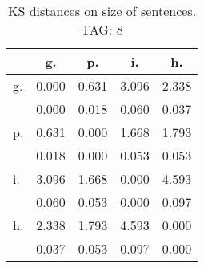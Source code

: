 \begin{table}[h!]
\begin{center}
\begin{tabular}{| l | c | c | c | c |}\hline
 & g. & p. & i. & h. \\\hline
g. & 0.000  & 0.631  & 3.096  & 2.338 \\\hline
 & 0.000  & 0.018  & 0.060  & 0.037 \\\hline
p. & 0.631  & 0.000  & 1.668  & 1.793 \\\hline
 & 0.018  & 0.000  & 0.053  & 0.053 \\\hline
i. & 3.096  & 1.668  & 0.000  & 4.593 \\\hline
 & 0.060  & 0.053  & 0.000  & 0.097 \\\hline
h. & 2.338  & 1.793  & 4.593  & 0.000 \\\hline
 & 0.037  & 0.053  & 0.097  & 0.000 \\\hline
\end{tabular}
\caption{KS distances on size of sentences. TAG: 8}
\end{center}
\end{table}